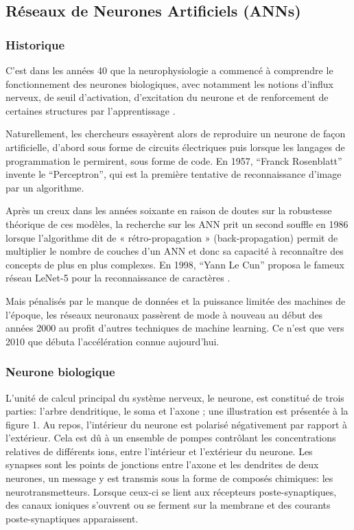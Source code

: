 \documentclass[12pt]{article}
\begin{document}
\subsection{Réseaux de Neurones Artificiels (ANNs)}
\subsubsection{Historique}
C’est dans les années 40 que la neurophysiologie a commencé à comprendre le fonctionnement des neurones biologiques, avec notamment les notions d’influx nerveux, de seuil d’activation, d’excitation du neurone et de renforcement de certaines structures par l’apprentissage \cite{11}.

Naturellement, les chercheurs essayèrent alors de reproduire un neurone de façon artificielle, d’abord sous forme de circuits électriques puis lorsque les langages de programmation le permirent, sous forme de code. En 1957, “Franck Rosenblatt” invente le “Perceptron”, qui est la première tentative de reconnaissance d’image par un algorithme.

Après un creux dans les années soixante en raison de doutes sur la robustesse théorique de ces modèles, la recherche sur les ANN prit un second souffle en 1986 lorsque l’algorithme dit de « rétro-propagation » (back-propagation) permit de multiplier le nombre de couches d’un ANN et donc sa capacité à reconnaître des concepts de plus en plus complexes. En 1998, “Yann Le Cun” proposa le fameux réseau LeNet-5 pour la reconnaissance de caractères \cite{11}.

Mais pénalisés par le manque de données et la puissance limitée des machines de l’époque, les réseaux neuronaux passèrent de mode à nouveau au début des années 2000 au profit d’autres techniques de machine learning. Ce n’est que vers 2010 que débuta l’accélération connue aujourd’hui.
\subsubsection{Neurone biologique}
L’unité de calcul principal du système nerveux, le neurone, est constitué de trois parties: l’arbre dendritique, le soma et l’axone ; une illustration est présentée à la figure 1. Au repos, l’intérieur du neurone est polarisé négativement par rapport à l’extérieur. Cela est dû à un ensemble de pompes contrôlant les concentrations relatives de différents ions, entre l’intérieur et l’extérieur du neurone. Les synapses sont les points de jonctions entre l’axone et les dendrites de deux neurones, un message y est transmis sous la forme de composés chimiques: les neurotransmetteurs. Lorsque ceux-ci se lient aux récepteurs poste-synaptiques, des canaux ioniques s’ouvrent ou se ferment sur la membrane et des courants poste-synaptiques apparaissent.
\end{document}
